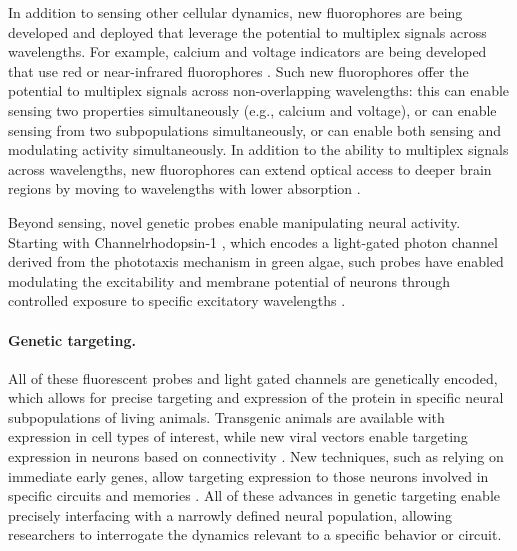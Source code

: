 In addition to sensing other cellular dynamics, new fluorophores  
are being developed and deployed that leverage the  
potential to multiplex signals across wavelengths. For example,
calcium and voltage indicators are being developed that use 
red or near-infrared fluorophores 
\cite{Tischbirek:2015fi,Dana:2016hx}. Such new fluorophores offer 
the potential to multiplex signals across non-overlapping 
wavelengths: this can enable sensing two properties 
simultaneously (e.g., calcium and voltage), or can enable sensing
from two subpopulations simultaneously, or can enable both 
sensing and modulating activity simultaneously. In addition to 
the ability to multiplex signals across wavelengths, new 
fluorophores can extend optical access to deeper brain regions by 
moving to wavelengths with lower absorption 
\cite{Tischbirek:2015fi,Dana:2016hx}.

Beyond sensing, novel genetic probes enable manipulating 
neural activity. Starting with Channelrhodopsin-1 
\cite{Nagel:2002cw}, which encodes a light-gated photon 
channel derived from the phototaxis mechanism in green 
algae, such probes have enabled modulating the excitability 
and membrane potential of neurons through controlled 
exposure to specific excitatory wavelengths 
\cite{Boyden:2005cd,Deisseroth:2006dd,Yizhar:2011jv}.

\paragraph{Genetic targeting.} All of these fluorescent probes 
and light gated channels are genetically encoded, which 
allows for precise targeting and expression of the protein 
in specific neural subpopulations of living animals. 
Transgenic animals are available with expression in cell
types of interest, while new viral vectors enable targeting 
expression in neurons based on connectivity \cite{Tervo:2016go}.
New techniques, such as relying on immediate early genes, 
allow targeting expression to those neurons involved 
in specific circuits and memories \cite{Liu:2012jv}. All 
of these advances in genetic targeting enable precisely
interfacing with a narrowly defined neural population, 
allowing researchers to interrogate the dynamics relevant 
to a specific behavior or circuit.

